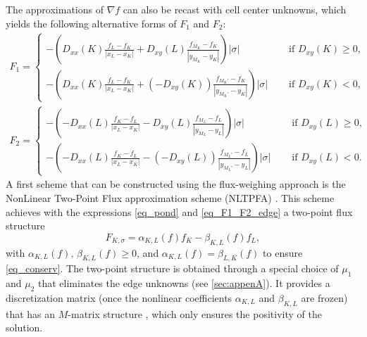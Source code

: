 \documentclass[final,11pt]{elsarticle}
\newcounter{bla}
\begin{document}
The approximations of $\nabla f$ can also be recast with cell center unknowns, which yields the following alternative forms of $F_1$ and $F_2$:
\begin{equation}
    \begin{gathered}
    F_1=\left\{\begin{array}{ll}
    \displaystyle-\left(D_{xx}(K)\frac{f_{L}-f_{K}}{|x_L-x_K|}+D_{xy}(L)\frac{f_{M_K}-f_{K}}{|y_{M_K}-y_K|}\right)|\sigma|&\quad\mbox{ if }D_{xy}(K)\geq 0,\\[1.2em]
    \displaystyle-\left(D_{xx}(K)\frac{f_{L}-f_{K}}{|x_L-x_K|}+(-D_{xy}(K))\frac{f_{M_K'}-f_{K}}{|y_{M_K'}-y_{K}|}\right)|\sigma|&\quad\mbox{ if } D_{xy}(K)< 0,
    \end{array}\right.\\
    F_2=\left\{\begin{array}{ll}
    \displaystyle-\left(-D_{xx}(L)\frac{f_{K}-f_{L}}{|x_L-x_K|}-D_{xy}(L)\frac{f_{M_L}-f_{L}}{|y_{M_L}-y_L|}\right)|\sigma|&\quad\mbox{ if }D_{xy}(L)\geq 0,\\[1.2em]
    \displaystyle-\left(-D_{xx}(L)\frac{f_{K}-f_{L}}{|x_L-x_K|}-(-D_{xy}(L))\frac{f_{M_L'}-f_{L}}{|y_{M_L'}-y_{L}|}\right)|\sigma|&\quad\mbox{ if } D_{xy}(L)< 0.
    \end{array}\right.
    \end{gathered}
    \label{eq_F1_F2_cell_centered}
\end{equation}
A first scheme that can be constructed using the flux-weighing approach is the NonLinear Two-Point Flux approximation scheme (NLTPFA) \cite{droniou2014,schneider2018,yuan2008,lepotier2005}. This scheme achieves with the expressions \eqref{eq_pond} and \eqref{eq_F1_F2_edge} a two-point flux structure
\begin{equation}
    F_{K,\sigma}=\alpha_{K,L}(f)f_{K}-\beta_{K,L}(f)f_{L},
    \label{eq_NLTPFA}
\end{equation}
with $\alpha_{K,L}(f),\,\beta_{K,L}(f)\geq 0$, and $\alpha_{K,L}(f)=\beta_{L,K}(f)$ to ensure \eqref{eq_conserv}. The two-point structure is obtained through a special choice of $\mu_1$ and $\mu_2$ that eliminates the edge unknowns (see \ref{sec:appenA}). It provides a discretization matrix (once the nonlinear coefficients $\alpha_{K,L}$ and $\beta_{K,L}$ are frozen) that has an $M$-matrix structure \cite{droniou2014}, which only ensures the positivity of the solution.
\end{document}
